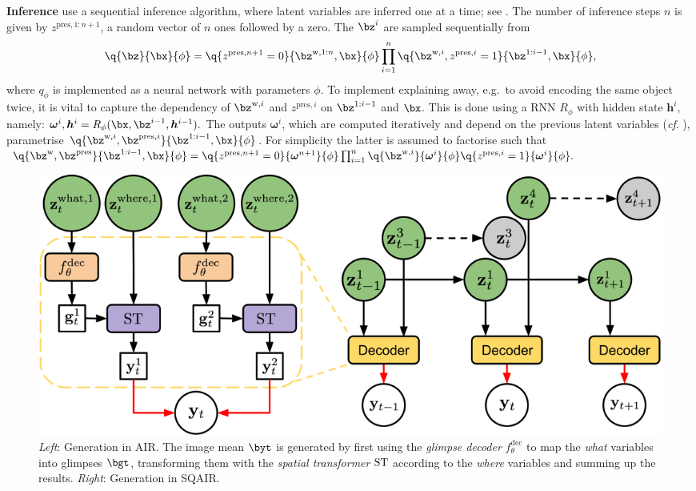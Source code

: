 \textbf{Inference}
\cite{Eslami2016air} use a sequential inference algorithm, where latent variables are inferred one at a time; see .
The number of inference steps $n$ is given by $z^{\mathrm{pres}, 1:n+1}$, a random vector of $n$ ones followed by a zero. The $\bz^{i}$ are sampled sequentially from
\vspace{-7pt}
\begin{equation} \label{eq:air_posterior}
    \q{\bz}{\bx}{\phi} = 
        \q{z^{\mathrm{pres}, n+1} = 0}{\bz^{\mathrm{w}, 1:n}, \bx}{\phi} 
        \prod_{i=1}^n 
        \q{\bz^{\mathrm{w}, i}, z^{\mathrm{pres}, i} = 1}{\bz^{1:i-1}, \bx}{\phi},
\end{equation}
where $q_\phi$ is implemented as a neural network with parameters $\phi$. 
To implement explaining away, e.g.\ to avoid encoding the same object twice, it is vital to capture the dependency of $\bz^{\mathrm{w},i}$ and  $z^{\mathrm{pres}, i}$ on $\bz^{1:i-1}$ and $\bx$. This is done using a \gls{RNN} $R_\phi$ with hidden state $\bm{h}^i$, namely:
$
    \bm{\omega}^i, \bm{h}^i = R_\phi (\bx, \bz^{i-1}, \bm{h}^{i-1}).
$
The outputs $\bm{\omega}^i$, which are computed iteratively and depend on the previous latent variables (\textit{cf}. ), parametrise $\q{\bz^{\mathrm{w},i}, \bz^{\mathrm{pres},i}}{\bz^{1:i-1}, \bx}{\phi}$. For simplicity the latter is assumed to factorise such that
$
    \q{\bz^{\mathrm{w}}, \bz^{\mathrm{pres}}}{\bz^{1:i-1}, \bx}{\phi} = \q{z^{\mathrm{pres}, n+1} = 0}{\bm{\omega}^{n+1}}{\phi} \prod_{i=1}^n \q{\bz^{\mathrm{w},i}}{\bm{\omega}^i}{\phi} \q{z^{\mathrm{pres}, i} = 1}{\bm{\omega}^i}{\phi}.
$

\begin{figure}
    \centering
    \includegraphics[width=0.7\linewidth]{figures/SQAIR/air_sqair_generation}
    \caption{
        \textit{Left}:
            Generation in \gls{AIR}.
            The image mean $\byt$ is generated by first using the \textit{glimpse decoder} $f_\theta^\mathrm{dec}$ to map the \textit{what} variables into glimpses $\bgt$, transforming them with the \textit{spatial transformer} $\operatorname{ST}$ according to the \textit{where} variables and summing up the results.
        \textit{Right}:
            Generation in \gls{SQAIR}.
    }
    \label{fig:generation}
\end{figure}

